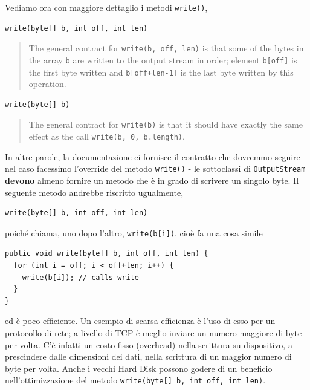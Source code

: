 \documentclass[\fontsizeclass,twocolumn]{\classname}
\theoremstyle{definition}
\theoremstyle{definition}
\begin{document}
Vediamo ora con maggiore dettaglio i metodi \texttt{write()},

\begin{lstlisting}
write(byte[] b, int off, int len)
\end{lstlisting}

\begin{quote}
    \footnotesize{The general contract for \texttt{write(b, off, len)} is that some of
        the bytes in the array \texttt{b} are written to the output stream in order; element
        \texttt{b[off]} is the first byte written and \texttt{b[off+len-1]} is the last byte written by
this operation.}
\end{quote}

\begin{lstlisting}
write(byte[] b)
\end{lstlisting}

\begin{quote}
    \footnotesize{The general contract for \texttt{write(b)} is that it should have
        exactly the same effect as the call \texttt{write(b, 0, b.length)}.
}
\end{quote}

In altre parole, la documentazione ci fornisce il contratto che dovremmo
seguire nel caso facessimo l'override del metodo \texttt{write()} \-- le
sottoclassi di \texttt{Output\-Stream} \textbf{devono} almeno fornire un metodo
che è in grado di scrivere un singolo byte. Il seguente metodo andrebbe riscritto ugualmente,

\begin{lstlisting}
write(byte[] b, int off, int len)
\end{lstlisting}

poiché chiama, uno dopo l'altro, \texttt{write(b[i])}, cioè fa una cosa simile

\begin{lstlisting}
public void write(byte[] b, int off, int len) {
  for (int i = off; i < off+len; i++) {
    write(b[i]); // calls write
  }
}
\end{lstlisting}

ed è poco efficiente. Un esempio di scarsa efficienza è l'uso di esso per un protocollo di rete;
a livello di TCP è meglio inviare un numero maggiore di byte per volta. C'è
infatti un costo fisso (overhead) nella scrittura su dispositivo, a prescindere
dalle dimensioni dei dati, nella scrittura di un maggior numero di byte per
volta. Anche i vecchi Hard Disk possono godere di un beneficio
nell'ottimizzazione del metodo \texttt{write(byte[] b, int off, int len)}.
\end{document}
